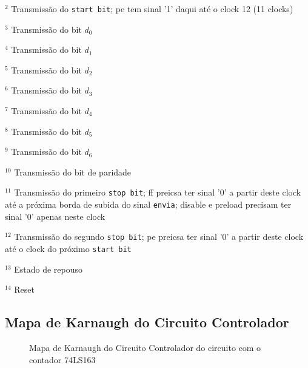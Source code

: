 \documentclass[a4,12pt]{horizon-theme}
\begin{document}
$^2$ Transmissão do \texttt{start bit}; pe tem sinal '1' daqui até o clock 12 (11 clocks)

$^3$ Transmissão do bit $d_0$

$^4$ Transmissão do bit $d_1$

$^5$ Transmissão do bit $d_2$

$^6$ Transmissão do bit $d_3$

$^7$ Transmissão do bit $d_4$

$^8$ Transmissão do bit $d_5$

$^9$ Transmissão do bit $d_6$

$^{10}$ Transmissão do bit de paridade

$^{11}$ Transmissão do primeiro \texttt{stop bit}; ff preicsa ter sinal '0' a partir deste clock até a próxima borda de subida do sinal \texttt{envia}; disable e preload precisam ter sinal '0' apenas neste clock

$^{12}$ Transmissão do segundo \texttt{stop bit}; pe preicsa ter sinal '0' a partir deste clock até o clock do próximo \texttt{start bit}

$^{13}$ Estado de repouso

$^{14}$ Reset

\newpage
\subsection{Mapa de Karnaugh do Circuito Controlador}
\label{ap:74163_karnaugh}

\begin{figure}[!ht]
    \centering
\caption{Mapa de Karnaugh do Circuito Controlador do circuito com o contador 74LS163}
\label{fig:karnaugh_74163}
\end{figure}


% 
% 

\horizonBackCover
\end{document}
